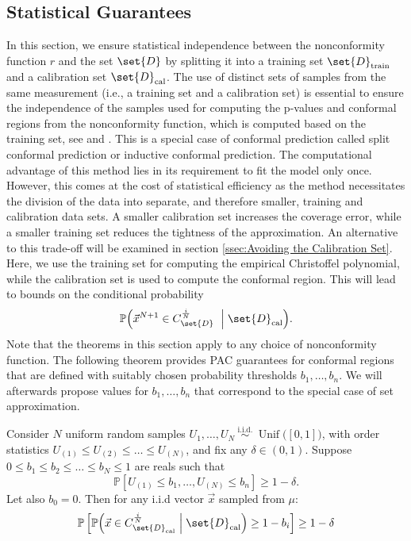 \documentclass[pmlr]{jmlr}%
\begin{document}
\subsection{Statistical Guarantees}
\label{ssec:Statistical Guarantees}
%
In this section, we ensure statistical independence between the nonconformity function $r$ and the set $\set{D}$
by splitting it into a training set $\set{D}_\mathrm{train}$ and a calibration set $\set{D}_\mathrm{cal}$. %
The use of distinct sets of samples from the same measurement (i.e., a training set and a calibration set) is essential to ensure the independence of the samples used for computing the p-values and conformal regions from the nonconformity function, which is computed based on the training set, see  \cite{Anastasios} and \cite{bates}. This is a special case of conformal prediction called split conformal prediction or inductive conformal prediction. The computational advantage of this method lies in its requirement to fit the model only once. However, this comes at the cost of statistical efficiency as the method necessitates the division of the data into separate, and therefore smaller, training and calibration data sets. A smaller calibration set increases the coverage error, while a smaller training set reduces the tightness of the approximation. An alternative to this trade-off will be examined in section \ref{ssec:Avoiding the Calibration Set}.
Here, we use the training set for computing the empirical Christoffel polynomial, while the calibration set is used to compute the conformal region. This will lead to bounds on the conditional probability
$$ \mathbb{P}\Bigl(\Vec{x}^{N+1} \in C_{\set{D}}^{\frac{i}{N}}\ \Bigm| \set{D}_\mathrm{cal} \Bigr).$$ 
%
%
Note that the theorems in this section %
apply to any choice of nonconformity function.
%
%
The following theorem %
provides PAC guarantees for conformal regions that are defined with suitably chosen probability thresholds $b_1,\ldots,b_n$.
We will afterwards propose values for $b_1,\ldots,b_n$ that correspond to the special case of set approximation.
%
 \begin{theorem}\label{thm:calibration}
Consider $N$ uniform random samples $U_1, \ldots, U_N \stackrel{\text { i.i.d. }}{\sim} \operatorname{Unif}\bigl([0,1]\bigr)$, with order statistics $U_{(1)} \leq U_{(2)} \leq \ldots \leq U_{(N)}$, and fix any $\delta \in(0,1)$. Suppose $0 \leq b_1 \leq b_2 \leq \ldots \leq b_N \leq 1$ are reals such that 
$$\mathbb{P}\left[U_{(1)} \leq b_1, \ldots, U_{(N)} \leq b_n\right] \geq 1-\delta. $$
Let also $b_0=0$. %
Then for any i.i.d vector $\Vec{x}$ sampled from $\mu$:
\begin{equation}\label{eq:bates}
    \mathbb{P}\left[\mathbb{P}\Bigl( \Vec{x} \in C_{\set{D}_\mathrm{cal}}^{\frac{i}{N}} \Bigm| \set{D}_\mathrm{cal}\Bigr) \geq 1 - b_i \right] \geq 1-\delta
\end{equation}
 \end{theorem}
\end{document}
